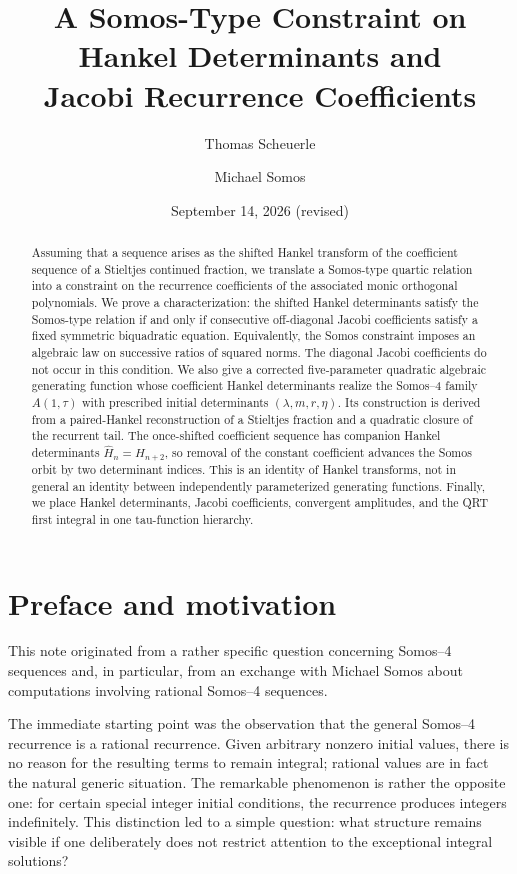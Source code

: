 \documentclass[11pt]{article}
\title{A Somos-Type Constraint on Hankel Determinants and\\Jacobi Recurrence Coefficients}
\author{Thomas Scheuerle \and Michael Somos}
\date{September 14, 2026 (revised)}
\theoremstyle{remark}
\begin{document}
\maketitle

\begin{abstract}
Assuming that a sequence arises as the shifted Hankel transform of the coefficient sequence of a Stieltjes continued fraction, we translate a Somos-type quartic relation into a constraint on the recurrence coefficients of the associated monic orthogonal polynomials. We prove a characterization: the shifted Hankel determinants satisfy the Somos-type relation if and only if consecutive off-diagonal Jacobi coefficients satisfy a fixed symmetric biquadratic equation. Equivalently, the Somos constraint imposes an algebraic law on successive ratios of squared norms. The diagonal Jacobi coefficients do not occur in this condition. We also give a corrected five-parameter quadratic algebraic generating function whose coefficient Hankel determinants realize the Somos--4 family $A(1,\tau)$ with prescribed initial determinants $(\lambda,m,r,\eta)$.  Its construction is derived from a paired-Hankel reconstruction of a Stieltjes fraction and a quadratic closure of the recurrent tail.  The once-shifted coefficient sequence has companion Hankel determinants $\widehat H_n=H_{n+2}$, so removal of the constant coefficient advances the Somos orbit by two determinant indices.  This is an identity of Hankel transforms, not in general an identity between independently parameterized generating functions. Finally, we place Hankel determinants, Jacobi coefficients, convergent amplitudes, and the QRT first integral in one tau-function hierarchy.  
\end{abstract}

\section*{Preface and motivation}

This note originated from a rather specific question concerning Somos--4 sequences and, in particular, from an exchange with Michael Somos about computations involving rational Somos--4 sequences.

The immediate starting point was the observation that the general Somos--4 recurrence is a rational recurrence. Given arbitrary nonzero initial values, there is no reason for the resulting terms to remain integral; rational values are in fact the natural generic situation. The remarkable phenomenon is rather the opposite one: for certain special integer initial conditions, the recurrence produces integers indefinitely. This distinction led to a simple question: what structure remains visible if one deliberately does not restrict attention to the exceptional integral solutions?
\end{document}
